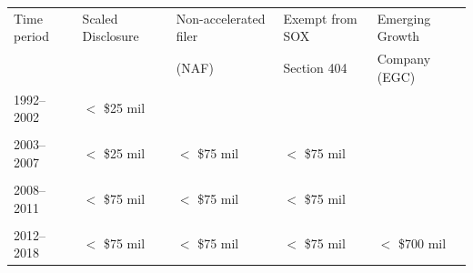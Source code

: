 \begin{centering}
	\begin{tabular*}{0.75\linewidth}{@{\extracolsep{\fill}}lllll@{}}
		\toprule
		Time period & Scaled Disclosure & Non-accelerated filer & Exempt from SOX  & Emerging Growth \\
		&  & (NAF) & Section 404 & Company (EGC) \\
		\midrule
		1992--2002 & $<$ \$25 mil & &  & \\
		& & & & \\ 
		2003--2007 & $<$ \$25 mil & $<$ \$75 mil & $<$ \$75 mil & \\
		& & & & \\ 		
		2008--2011 & $<$ \$75 mil & $<$ \$75 mil & $<$ \$75 mil & \\
		& & & & \\ 		
		2012--2018 & $<$ \$75 mil  & $<$ \$75 mil & $<$ \$75 mil & $<$ \$700 mil \\
		\bottomrule
	\end{tabular*}%
	\label{tab:regulation_thresholds}%
	\par
\end{centering}%
